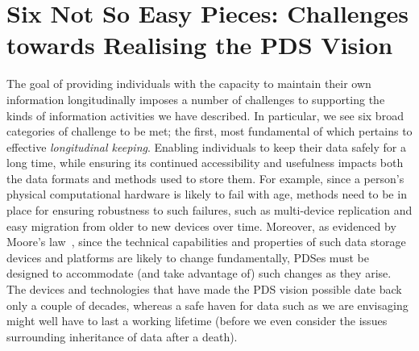 \documentclass[graybox]{svmult}
\begin{document}

\section{Six Not So Easy Pieces: Challenges towards Realising the PDS Vision}


The goal of providing individuals with the capacity to maintain their own information longitudinally imposes a number of challenges to supporting the kinds of information activities we have described.  In particular, we see six broad categories of challenge to be met; the first, most fundamental of which pertains to effective \emph{longitudinal keeping}.  Enabling individuals to keep their data safely for a long time, while ensuring its continued accessibility and usefulness impacts both the data formats and methods used to store them.  For example, since a person's physical computational hardware is likely to fail with age, methods need to be in place for ensuring robustness to such failures, such as multi-device replication and easy migration from older to new devices over time.   Moreover, as evidenced by Moore's law~\cite{schaller1997moore}, since the technical capabilities and properties of such data storage devices and platforms are likely to change fundamentally, PDSes must be designed to accommodate (and take advantage of) such changes as they arise. The devices and technologies that have made the PDS vision possible date back only a couple of decades, whereas a safe haven for data such as we are envisaging might well have to last a working lifetime (before we even consider the issues surrounding inheritance of data after a death).
\end{document}
